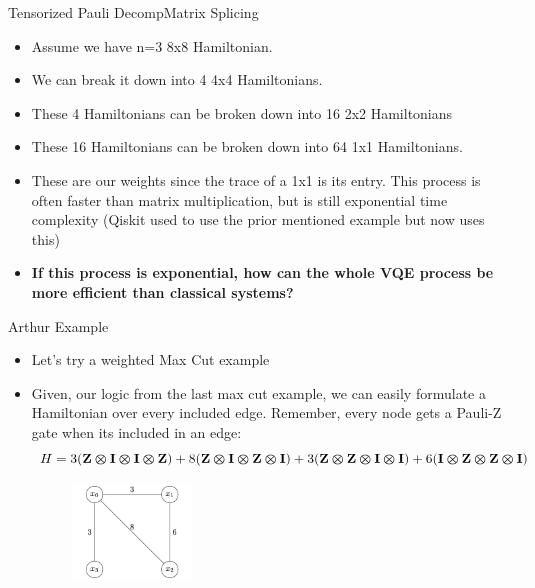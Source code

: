 \begin{frame}{Tensorized Pauli Decomp}{Matrix Splicing}
    \begin{itemize}
        \item Assume we have n=3 8x8 Hamiltonian.
        \item We can break it down into 4 4x4 Hamiltonians.
        \item These 4 Hamiltonians can be broken down into 16 2x2 Hamiltonians
        \item These 16 Hamiltonians can be broken down into 64 1x1 Hamiltonians.
        \item These are our weights since the trace of a 1x1 is its entry. This process is often faster than matrix multiplication, but is still exponential time complexity (Qiskit used to use the prior mentioned example but now uses this)
        \item \textbf{If this process is exponential, how can the whole VQE process be more efficient than classical systems?}
    \end{itemize}
\end{frame}

\begin{frame}{Arthur Example}
    \begin{itemize}
        \item Let's try a weighted Max Cut example
        \item Given, our logic from the last max cut example, we can easily formulate a Hamiltonian over every included edge. Remember, every node gets a Pauli-Z gate when its included in an edge:
        \[H = 3(\mbox{\bfseries{\textrm{Z}}} \bm{\otimes} \mbox{\bfseries{\textrm{I}}} \bm{\otimes} \mbox{\bfseries{\textrm{I}}} \bm{\otimes} \mbox{\bfseries{\textrm{Z}}}) + 8(\mbox{\bfseries{\textrm{Z}}} \bm{\otimes} \mbox{\bfseries{\textrm{I}}} \bm{\otimes} \mbox{\bfseries{\textrm{Z}}} \bm{\otimes} \mbox{\bfseries{\textrm{I}}}) + 3(\mbox{\bfseries{\textrm{Z}}} \bm{\otimes} \mbox{\bfseries{\textrm{Z}}} \bm{\otimes} \mbox{\bfseries{\textrm{I}}} \bm{\otimes} \mbox{\bfseries{\textrm{I}}}) + 6(\mbox{\bfseries{\textrm{I}}} \bm{\otimes} \mbox{\bfseries{\textrm{Z}}} \bm{\otimes} \mbox{\bfseries{\textrm{Z}}} \bm{\otimes} \mbox{\bfseries{\textrm{I}}})
        \]
        \begin{figure}[h]
            \centering
            \includegraphics[width=0.3\textwidth]{400/Weighted_Max_Cut.png}
        \end{figure}
        
    \end{itemize}
    
\end{frame}

